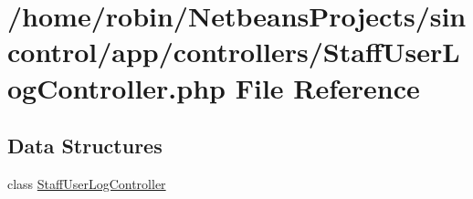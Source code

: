 \hypertarget{_staff_user_log_controller_8php}{}\section{/home/robin/\+Netbeans\+Projects/sincontrol/app/controllers/\+Staff\+User\+Log\+Controller.php File Reference}
\label{_staff_user_log_controller_8php}
\subsection*{Data Structures}
\begin{DoxyCompactItemize}
\item 
class \hyperlink{class_staff_user_log_controller}{Staff\+User\+Log\+Controller}
\end{DoxyCompactItemize}
